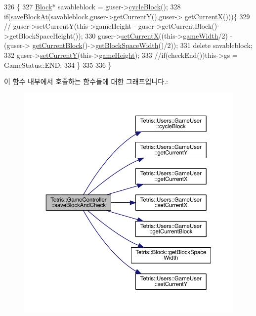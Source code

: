 \begin{DoxyCode}
326                                                         \{
327                 \hyperlink{class_tetris_1_1_block}{Block}* savableblock = guser->\hyperlink{class_tetris_1_1_users_1_1_game_user_a5efbd1ed9fa84a4041c218fb32463c36}{cycleBlock}();
328                 \textcolor{keywordflow}{if}(\hyperlink{class_tetris_1_1_game_controller_adc067380df0f0da4ea4a358d00d6a123}{saveBlockAt}(savableblock,guser->\hyperlink{class_tetris_1_1_users_1_1_game_user_af5bd7ff0b575af1b42b093488cff97e2}{getCurrentY}(),guser->
      \hyperlink{class_tetris_1_1_users_1_1_game_user_ad25eace96bd27ae6df4a0c0d506be730}{getCurrentX}()))\{
329                        \textcolor{comment}{// guser->setCurrentY(this->gameHeight -
       guser->getCurrentBlock()->getBlockSpaceHeight());}
330                         guser->\hyperlink{class_tetris_1_1_users_1_1_game_user_a2957358b1a6298f06c6c2e10cb89f623}{setCurrentX}((this->\hyperlink{class_tetris_1_1_game_controller_a439f215918db4127fcb44cf9d501ed63}{gameWidth}/2) - (guser->
      \hyperlink{class_tetris_1_1_users_1_1_game_user_a3d4bcc74d518c28356012f8a42b85896}{getCurrentBlock}()->\hyperlink{class_tetris_1_1_block_ac390e14de476582300d815d9054ed9bd}{getBlockSpaceWidth}()/2));
331                         \textcolor{keyword}{delete} savableblock;
332                         guser->\hyperlink{class_tetris_1_1_users_1_1_game_user_aeedbe521004c22018b73a509e99f7d81}{setCurrentY}(this->\hyperlink{class_tetris_1_1_game_controller_a8e3adc647ed382de0ff541417bea9b33}{gameHeight});
333                         \textcolor{comment}{//if(checkEnd())this->gs = GameStatus::END;}
334                 \}
335                 
336             \}
\end{DoxyCode}
이 함수 내부에서 호출하는 함수들에 대한 그래프입니다.\+:
\nopagebreak
\begin{figure}[H]
\begin{center}
\leavevmode
\includegraphics[width=350pt]{db/dd2/class_tetris_1_1_game_controller_a3c63a9754e4cbeae4f66a5760bb4055d_cgraph}
\end{center}
\end{figure}

